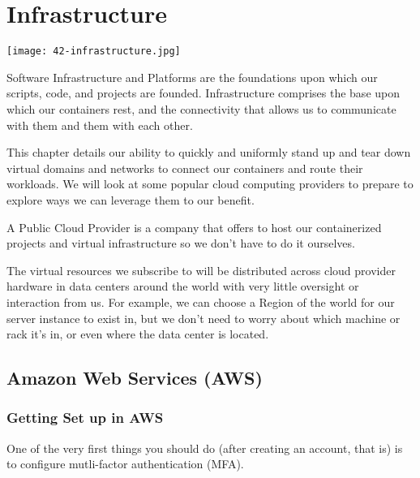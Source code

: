 \chapter{Infrastructure}

\justifying
\texttt{[image: 42-infrastructure.jpg]}

\justifying
Software Infrastructure and Platforms are the foundations upon which our
scripts, code, and projects are founded. Infrastructure comprises the
base upon which our containers rest, and the connectivity that allows us
to communicate with them and them with each other.

\justifying
This chapter details our ability to quickly and uniformly stand up and
tear down virtual domains and networks to connect our containers and
route their workloads. We will look at some popular cloud computing
providers to prepare to explore ways we can leverage them to our
benefit.

\justifying
A Public Cloud Provider is a company that offers to host our containerized projects and virtual infrastructure
so we don't have to do it ourselves.

\justifying
The virtual resources we subscribe to will be distributed across cloud provider hardware in data centers around
the world with very little oversight or interaction from us. For example, we can choose a Region of the world
for our server instance to exist in, but we don't need to worry about which machine or rack it's in, or even
where the data center is located.

\section{Amazon Web Services (AWS)}



\subsection{Getting Set up in AWS}

\justifying
One of the very first things you should do (after creating an account, that is) is to configure mutli-factor
authentication (MFA).


